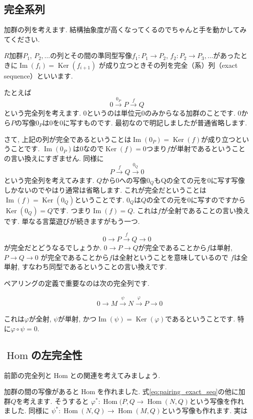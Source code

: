 \documentclass{jsarticle}
\newcommand{\makeop}[1]{\mathop{\mathrm{#1}}\nolimits}
\def\Im{\makeop{Im}}
\def\Ker{\makeop{Ker}}
\def\Hom{\makeop{Hom}}
\theoremstyle{definition}
\numberwithin{theorem}{section}
\begin{document}
\subsection{完全系列}
加群の列を考えます. 結構抽象度が高くなってくるのでちゃんと手を動かしてみてください.

$R$加群$P_1$, $P_2, \ldots$の列とその間の準同型写像$f_1: P_1 \rightarrow P_2$, $f_2:P_2 \rightarrow P_3, \ldots$があったときに$\Im(f_i) = \Ker(f_{i+1})$
が成り立つときその列を完全（系）列（exact sequence）といいます.

たとえば
\[
0 \xrightarrow{0_P} P \xrightarrow{f} Q
\]
という完全列を考えます. $0$というのは単位元$0$のみからなる加群のことです. $0$から$P$の写像$0_P$は$0$を$0$に写すものです.
最初なので明記しましたが普通省略します.

さて, 上記の列が完全であるということは$\Im(0_P) = \Ker(f)$が成り立つということです. $\Im(0_P)$は$0$なので$\Ker(f) = 0$つまり$f$が単射であるということの言い換えにすぎません.
同様に
\[
P \xrightarrow{f} Q \xrightarrow{0_Q} 0
\]
という完全列を考えてみます. $Q$から$0$への写像$0_Q$もQの全ての元を$0$に写す写像しかないのでやはり通常は省略します.
これが完全だということは$\Im(f) = \Ker(0_Q)$ということです.
$0_Q$は$Q$の全ての元を$0$に写すのですから$\Ker(0_Q) = Q$です. つまり$\Im(f) = Q$.
これは$f$が全射であることの言い換えです. 単なる言葉遊びが続きますがもう一つ.

\[
0 \rightarrow P \xrightarrow{f} Q \rightarrow 0
\]
が完全だとどうなるでしょうか. $0 \rightarrow P \rightarrow Q$が完全であることから$f$は単射, $P\rightarrow Q \rightarrow 0$
が完全であることから$f$は全射ということを意味しているので $f$は全単射, すなわち同型であるということの言い換えです.

ペアリングの定義で重要なのは次の完全列です.

\begin{align}
\label{eq:pairing_exact_seq}
& 0 \rightarrow M \xrightarrow{\displaystyle\psi} N \xrightarrow{\displaystyle\varphi} P\rightarrow 0
\end{align}

これは$\varphi$が全射, $\psi$が単射, かつ$\Im(\psi) = \Ker(\varphi)$であるということです. 特に$\varphi\circ\psi = 0$.

\subsection{$\Hom$の左完全性}
前節の完全列と$\Hom$との関連を考えてみましょう.

加群の間の写像があると$\Hom$を作れました. 式\ref{eq:pairing_exact_seq}の他に加群$Q$を考えます. そうすると
$\varphi^*: \Hom(P, Q \rightarrow \Hom(N, Q)$という写像を作れました. 同様に
$\psi^*: \Hom(N, Q) \rightarrow \Hom(M, Q)$という写像も作れます. 実は
\end{document}
